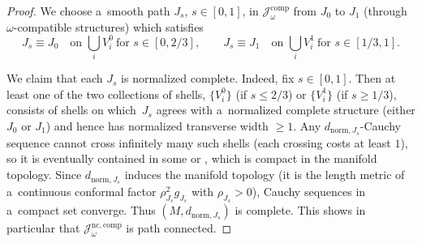 \documentclass[10pt,a4paper]{amsart}
\numberwithin{equation}{section}
\theoremstyle{definition}
\begin{document}
\begin{proof}
We choose a~smooth path $J_s$, $s\in[0,1]$, in $\mathcal{J}^{\mathrm{comp}}_\omega$ from $J_0$ to $J_1$ (through $\omega$-compatible structures) which satisfies
\[
J_s\equiv J_0\quad \text{on }\bigcup_i V_i^0\ \text{for }s\in[0,2/3],
\qquad
J_s\equiv J_1\quad \text{on }\bigcup_i V_i^1\ \text{for }s\in[1/3,1].
\]


We claim that each $J_s$ is normalized complete.
Indeed, fix $s\in[0,1]$. Then at least one of the two collections of shells,
$\big\{V_i^0\big\}$ (if $s\le 2/3$) or $\big\{V_i^1\big\}$ (if $s\ge 1/3$),
consists of shells on which~$J_s$ agrees with a~normalized complete structure (either $J_0$ or $J_1$) and hence has normalized transverse width $\ge 1$.
Any $d_{\mathrm{norm},J_s}$-Cauchy sequence cannot cross infinitely many such shells (each crossing costs at least $1$), so it is eventually contained in some  or , which is compact in the manifold topology.
Since $d_{\mathrm{norm},J_s}$ induces the manifold topology (it is the length metric of a~continuous conformal factor $\rho_{J_s}^{2}g_{J_s}$ with $\rho_{J_s}>0$), Cauchy sequences in a~compact set converge.
Thus $(M,d_{\mathrm{norm},J_s})$ is complete.
This shows in particular that $\mathcal{J}^{\mathrm{nc,comp}}_\omega$ is path connected.
\end{proof}
\end{document}
